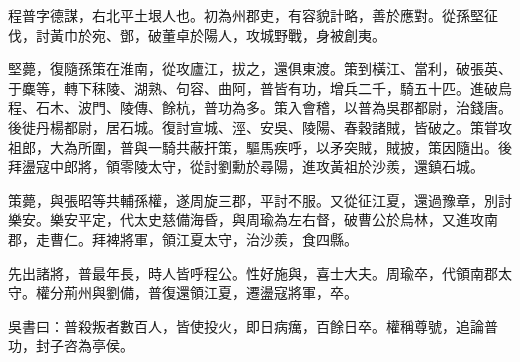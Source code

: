 
\begin{pinyinscope}
程普字德謀，右北平土垠人也。初為州郡吏，有容貌計略，善於應對。從孫堅征伐，討黃巾於宛、鄧，破董卓於陽人，攻城野戰，身被創夷。

堅薨，復隨孫策在淮南，從攻廬江，拔之，還俱東渡。策到橫江、當利，破張英、于麋等，轉下秣陵、湖熟、句容、曲阿，普皆有功，增兵二千，騎五十匹。進破烏程、石木、波門、陵傳、餘杭，普功為多。策入會稽，以普為吳郡都尉，治錢唐。後徙丹楊都尉，居石城。復討宣城、涇、安吳、陵陽、春穀諸賊，皆破之。策甞攻祖郎，大為所圍，普與一騎共蔽扞策，驅馬疾呼，以矛突賊，賊披，策因隨出。後拜盪寇中郎將，領零陵太守，從討劉勳於尋陽，進攻黃祖於沙羨，還鎮石城。

策薨，與張昭等共輔孫權，遂周旋三郡，平討不服。又從征江夏，還過豫章，別討樂安。樂安平定，代太史慈備海昏，與周瑜為左右督，破曹公於烏林，又進攻南郡，走曹仁。拜裨將軍，領江夏太守，治沙羨，食四縣。

先出諸將，普最年長，時人皆呼程公。性好施與，喜士大夫。周瑜卒，代領南郡太守。權分荊州與劉備，普復還領江夏，遷盪寇將軍，卒。

吳書曰：普殺叛者數百人，皆使投火，即日病癘，百餘日卒。權稱尊號，追論普功，封子咨為亭侯。


\end{pinyinscope}